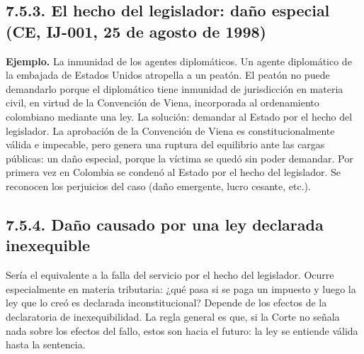 \subsection{7.5.3. El hecho del legislador: daño especial (CE, IJ-001, 25 de agosto de 1998)}
\begin{ejemplo}
\textcolor[HTML]{4F6228}{\textbf{Ejemplo. }}La inmunidad de los agentes diplomáticos. Un agente diplomático de la embajada de Estados Unidos atropella a un peatón. El peatón no puede demandarlo porque el diplomático tiene inmunidad de jurisdicción en materia civil, en virtud de la Convención de Viena, incorporada al ordenamiento colombiano mediante una ley. La solución: demandar al Estado por el hecho del legislador. La aprobación de la Convención de Viena es constitucionalmente válida e impecable, pero genera una ruptura del equilibrio ante las cargas públicas: un daño especial, porque la víctima se quedó sin poder demandar. Por primera vez en Colombia se condenó al Estado por el hecho del legislador. Se reconocen los perjuicios del caso (daño emergente, lucro cesante, etc.).
\end{ejemplo}
\subsection{7.5.4. Daño causado por una ley declarada inexequible}
Sería el equivalente a la falla del servicio por el hecho del legislador. Ocurre especialmente en materia tributaria: ¿qué pasa si se paga un impuesto y luego la ley que lo creó es declarada inconstitucional? Depende de los efectos de la declaratoria de inexequibilidad. La regla general es que, si la Corte no señala nada sobre los efectos del fallo, estos son hacia el futuro: la ley se entiende válida hasta la sentencia.

